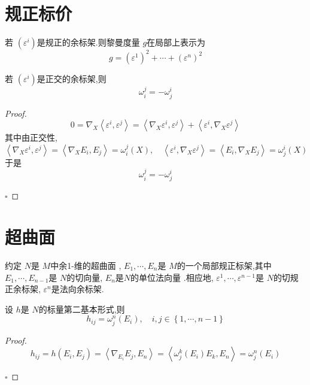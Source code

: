 \documentclass[../../main.tex]{subfiles}
\begin{document}
\section{规正标价}

\begin{proposition}
    若 \(  \left(  \varepsilon ^{i} \right)   \)是规正的余标架.则黎曼度量 \(  g  \)在局部上表示为 \[
    g = \left(  \varepsilon ^{1} \right)^{2}+ \cdots + \left(  \varepsilon ^{n} \right)^{2}  
    \]  
\end{proposition}

\begin{proposition}
    若 \(  \left(  \varepsilon ^{i} \right)   \)是正交的余标架,则 \[
     \omega _{i}^{j}= - \omega _{j}^{i}
    \]
\end{proposition}
\begin{proof}
    \[
  0=   \nabla _{X}\left< \varepsilon ^{i}, \varepsilon ^{j} \right>= \left< \nabla_{X}  \varepsilon ^{i}, \varepsilon ^{j} \right>+ \left< \varepsilon ^{i}, \nabla _{X} \varepsilon ^{j} \right>
    \] 其中由正交性, \[
    \left< \nabla _{X} \varepsilon ^{i}, \varepsilon ^{j} \right>= \left< \nabla _{X}E_{i},E_{j} \right>= \omega _{i}^{j}\left( X \right),\quad \left< \varepsilon ^{i}, \nabla _{X} \varepsilon ^{j} \right>= \left<E_{i}, \nabla _{X}E_{j} \right>=  \omega _{j}^{i}\left( X \right)   
    \]于是 \[
     \omega _{i}^{j}= - \omega _{j}^{i}
    \]

    \hfill $\square$
\end{proof}

\section{超曲面}

约定 \(  N  \)是 \(  M  \)中余1-维的超曲面 , \(   E_1,\cdots,E_n   \)是 \(  M  \)的一个局部规正标架,其中 \(  E_1,\cdots ,E_{n-1}  \)是 \(  N  \)的切向量, \(  E_{n}  \)是\(  N  \)的单位法向量       .相应地, \(  \varepsilon ^{1},\cdots , \varepsilon ^{n-1}  \)是 \(  N  \)的切规正余标架, \(   \varepsilon ^{n}  \)是法向余标架.       

\begin{theorem}
    设 \(  h  \)是 \(  N  \)的标量第二基本形式,则 \[
    h_{ij}=  \omega _{j}^{n}\left( E_{i} \right),\quad i,j\in \left\{ 1,\cdots ,n-1 \right\} 
    \]  
\end{theorem}
\begin{proof}
    \[
    h_{ij}= h\left( E_{i},E_{j} \right)= \left< \nabla _{E_{i}}E_{j},E_{n} \right>= \left< \omega _{j}^{k}\left( E_{i} \right)E_{k},E_{n}  \right> =  \omega _{j}^{n}\left( E_{i} \right) 
    \]

    \hfill $\square$
\end{proof}
\end{document}
